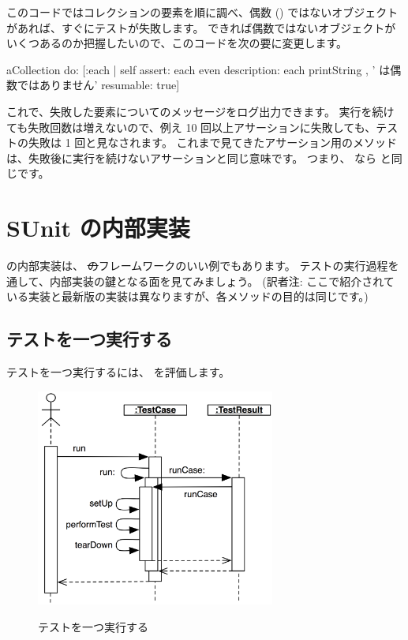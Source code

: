 \documentclass[a4paper,10pt,twoside]{book}
\begin{document}
このコードではコレクションの要素を順に調べ、偶数 () ではないオブジェクトがあれば、すぐにテストが失敗します。
できれば偶数ではないオブジェクトがいくつあるのか把握したいので、このコードを次の要に変更します。

\begin{code}{}
aCollection do:
	[:each |
	self
		assert: each even
		description: each printString , ' は偶数ではありません'
		resumable: true]
\end{code}

これで、失敗した要素についてのメッセージをログ出力できます。
実行を続けても失敗回数は増えないので、例え 10 回以上アサーションに失敗しても、テストの失敗は 1 回と見なされます。
これまで見てきたアサーション用のメソッドは、失敗後に実行を続けないアサーションと同じ意味です。
つまり、  なら  と同じです。


\section{SUnit の内部実装}

\sunit の内部実装は、 \st のフレームワークのいい例でもあります。
テストの実行過程を通して、内部実装の鍵となる面を見てみましょう。
(訳者注: ここで紹介されている実装と最新版の実装は異なりますが、各メソッドの目的は同じです。)

\subsection{テストを一つ実行する}

テストを一つ実行するには、  を評価します。

\begin{figure}[tbh]
  \begin{center}
		{\includegraphics[width=0.7\textwidth]{sunit-scenario}}
	\caption{テストを一つ実行する}
  \end{center}
\end{figure}
\end{document}
